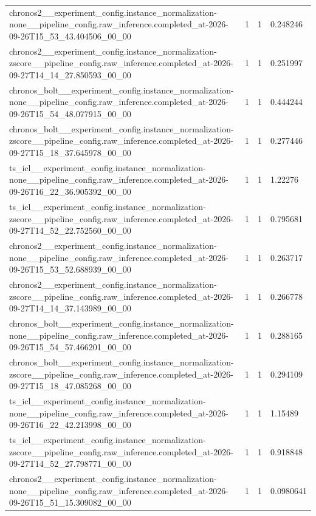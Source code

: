 \begin{tabular}{llll}
chronos2\_\_experiment\_config.instance\_normalization-none\_\_pipeline\_config.raw\_inference.completed\_at-2026-09-26T15\_53\_43.404506\_00\_00 & 1 & 1 & 0.248246 \\
chronos2\_\_experiment\_config.instance\_normalization-zscore\_\_pipeline\_config.raw\_inference.completed\_at-2026-09-27T14\_14\_27.850593\_00\_00 & 1 & 1 & 0.251997 \\
chronos\_bolt\_\_experiment\_config.instance\_normalization-none\_\_pipeline\_config.raw\_inference.completed\_at-2026-09-26T15\_54\_48.077915\_00\_00 & 1 & 1 & 0.444244 \\
chronos\_bolt\_\_experiment\_config.instance\_normalization-zscore\_\_pipeline\_config.raw\_inference.completed\_at-2026-09-27T15\_18\_37.645978\_00\_00 & 1 & 1 & 0.277446 \\
ts\_icl\_\_experiment\_config.instance\_normalization-none\_\_pipeline\_config.raw\_inference.completed\_at-2026-09-26T16\_22\_36.905392\_00\_00 & 1 & 1 & 1.22276 \\
ts\_icl\_\_experiment\_config.instance\_normalization-zscore\_\_pipeline\_config.raw\_inference.completed\_at-2026-09-27T14\_52\_22.752560\_00\_00 & 1 & 1 & 0.795681 \\
chronos2\_\_experiment\_config.instance\_normalization-none\_\_pipeline\_config.raw\_inference.completed\_at-2026-09-26T15\_53\_52.688939\_00\_00 & 1 & 1 & 0.263717 \\
chronos2\_\_experiment\_config.instance\_normalization-zscore\_\_pipeline\_config.raw\_inference.completed\_at-2026-09-27T14\_14\_37.143989\_00\_00 & 1 & 1 & 0.266778 \\
chronos\_bolt\_\_experiment\_config.instance\_normalization-none\_\_pipeline\_config.raw\_inference.completed\_at-2026-09-26T15\_54\_57.466201\_00\_00 & 1 & 1 & 0.288165 \\
chronos\_bolt\_\_experiment\_config.instance\_normalization-zscore\_\_pipeline\_config.raw\_inference.completed\_at-2026-09-27T15\_18\_47.085268\_00\_00 & 1 & 1 & 0.294109 \\
ts\_icl\_\_experiment\_config.instance\_normalization-none\_\_pipeline\_config.raw\_inference.completed\_at-2026-09-26T16\_22\_42.213998\_00\_00 & 1 & 1 & 1.15489 \\
ts\_icl\_\_experiment\_config.instance\_normalization-zscore\_\_pipeline\_config.raw\_inference.completed\_at-2026-09-27T14\_52\_27.798771\_00\_00 & 1 & 1 & 0.918848 \\
chronos2\_\_experiment\_config.instance\_normalization-none\_\_pipeline\_config.raw\_inference.completed\_at-2026-09-26T15\_51\_15.309082\_00\_00 & 1 & 1 & 0.0980641 \\

\end{tabular}
